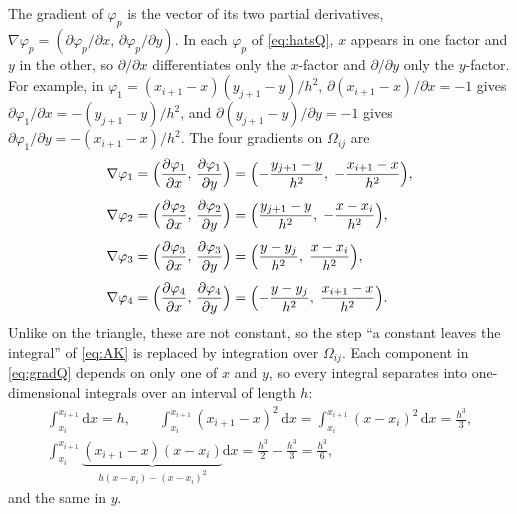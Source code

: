 \documentclass[11pt]{article}
\newcommand{\Om}{\Omega}
\newcommand{\grad}{\nabla}
\begin{document}
The gradient of $\varphi_{p}$ is the vector of its two partial derivatives,
$\grad\varphi_{p}=(\partial\varphi_{p}/\partial x,\,\partial\varphi_{p}/\partial y)$.
In each $\varphi_{p}$ of \eqref{eq:hatsQ}, $x$ appears in one factor and $y$
in the other, so $\partial/\partial x$ differentiates only the $x$-factor and
$\partial/\partial y$ only the $y$-factor.  For example, in
$\varphi_{1}=(x_{i+1}-x)(y_{j+1}-y)/h^{2}$, $\partial(x_{i+1}-x)/\partial x=-1$
gives $\partial\varphi_{1}/\partial x=-(y_{j+1}-y)/h^{2}$, and
$\partial(y_{j+1}-y)/\partial y=-1$ gives
$\partial\varphi_{1}/\partial y=-(x_{i+1}-x)/h^{2}$.  The four gradients on
$\Om_{ij}$ are
\begin{equation}\label{eq:gradQ}
  \begin{aligned}
  \grad\varphi_{1}&=\Bigl(\frac{\partial\varphi_{1}}{\partial x},\,\frac{\partial\varphi_{1}}{\partial y}\Bigr)=\Bigl(-\frac{y_{j+1}-y}{h^{2}},\;-\frac{x_{i+1}-x}{h^{2}}\Bigr),\\[3pt]
  \grad\varphi_{2}&=\Bigl(\frac{\partial\varphi_{2}}{\partial x},\,\frac{\partial\varphi_{2}}{\partial y}\Bigr)=\Bigl(\frac{y_{j+1}-y}{h^{2}},\;-\frac{x-x_{i}}{h^{2}}\Bigr),\\[3pt]
  \grad\varphi_{3}&=\Bigl(\frac{\partial\varphi_{3}}{\partial x},\,\frac{\partial\varphi_{3}}{\partial y}\Bigr)=\Bigl(\frac{y-y_{j}}{h^{2}},\;\frac{x-x_{i}}{h^{2}}\Bigr),\\[3pt]
  \grad\varphi_{4}&=\Bigl(\frac{\partial\varphi_{4}}{\partial x},\,\frac{\partial\varphi_{4}}{\partial y}\Bigr)=\Bigl(-\frac{y-y_{j}}{h^{2}},\;\frac{x_{i+1}-x}{h^{2}}\Bigr).
  \end{aligned}
\end{equation}
Unlike on the triangle, these are not constant, so the step ``a constant
leaves the integral'' of \eqref{eq:AK} is replaced by integration over
$\Om_{ij}$.  Each component in \eqref{eq:gradQ} depends on only one of $x$ and
$y$, so every integral separates into one-dimensional integrals over an
interval of length $h$:
\begin{equation}\label{eq:1d}
  \begin{gathered}
  \int_{x_{i}}^{x_{i+1}}\!\mathrm{d}x=h,\qquad
  \int_{x_{i}}^{x_{i+1}}\!(x_{i+1}-x)^{2}\,\mathrm{d}x
  =\int_{x_{i}}^{x_{i+1}}\!(x-x_{i})^{2}\,\mathrm{d}x=\frac{h^{3}}{3},\\
  \int_{x_{i}}^{x_{i+1}}\!\underbrace{(x_{i+1}-x)(x-x_{i})}_{h(x-x_{i})-(x-x_{i})^{2}}\mathrm{d}x
  =\frac{h^{3}}{2}-\frac{h^{3}}{3}=\frac{h^{3}}{6},
  \end{gathered}
\end{equation}
and the same in $y$.
\end{document}
